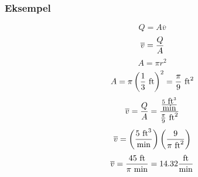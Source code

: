 \documentclass{beamer}
\begin{document}
%
%
\begin{frame}
	\frametitle{Eksempel}

	


%
$$Q = A \overline{v}$$
%
$$\overline{v} = {Q \over A}$$
%
%
$$A = \pi r^2$$
%
$$A = \pi \left({1 \over 3} \hbox{ ft}\right)^2 = {\pi \over 9} \hbox{ ft}^2$$
%
%
$$\overline{v} = {Q \over A} = {{5 \hbox{ ft}^3 \over \hbox{min}} \over {{\pi \over 9} \hbox{ ft}^2}}$$
%
$$\overline{v} = \left({5 \hbox{ ft}^3 \over \hbox{min}}\right) \left({9 \over {\pi \hbox{ ft}^2}}\right)$$
%
$$\overline{v} = {45 \hbox{ ft} \over \pi \hbox{ min}} = 14.32 {\hbox{ft} \over \hbox{min}}$$
%
\end{frame}
\end{document}
